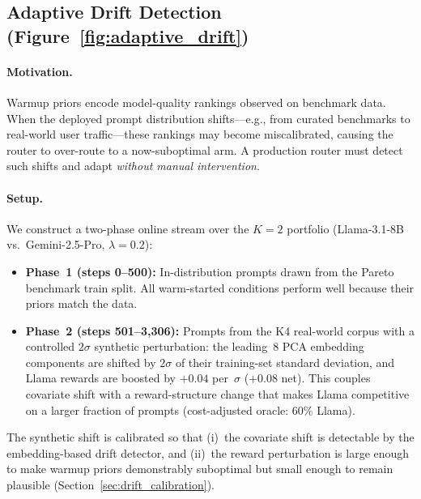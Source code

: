 
\subsection{Adaptive Drift Detection (Figure~\ref{fig:adaptive_drift})}
\label{sec:adaptive_drift}

\paragraph{Motivation.}
Warmup priors encode model-quality rankings observed on benchmark data.
When the deployed prompt distribution shifts---e.g., from curated
benchmarks to real-world user traffic---these rankings may become
miscalibrated, causing the router to over-route to a now-suboptimal
arm.  A production router must detect such shifts and adapt
\emph{without manual intervention}.

\paragraph{Setup.}
We construct a two-phase online stream over the $K{=}2$ portfolio
(Llama-3.1-8B vs.\ Gemini-2.5-Pro, $\lambda{=}0.2$):
\begin{itemize}[leftmargin=*,noitemsep]
  \item \textbf{Phase~1 (steps 0--500):}
        In-distribution prompts drawn from the Pareto benchmark
        train split.  All warm-started conditions perform well because
        their priors match the data.
  \item \textbf{Phase~2 (steps 501--3{,}306):}
        Prompts from the K4 real-world corpus with a controlled
        $2\sigma$ synthetic perturbation: the leading~8 PCA embedding
        components are shifted by $2\sigma$ of their training-set
        standard deviation, and Llama rewards are boosted by
        $+0.04$ per~$\sigma$ ($+0.08$ net).  This couples covariate
        shift with a reward-structure change that makes Llama
        competitive on a larger fraction of prompts (cost-adjusted
        oracle: 60\% Llama).
\end{itemize}

\noindent
The synthetic shift is calibrated so that (i)~the covariate shift is
detectable by the embedding-based drift detector, and (ii)~the reward
perturbation is large enough to make warmup priors demonstrably
suboptimal but small enough to remain plausible
(Section~\ref{sec:drift_calibration}).


